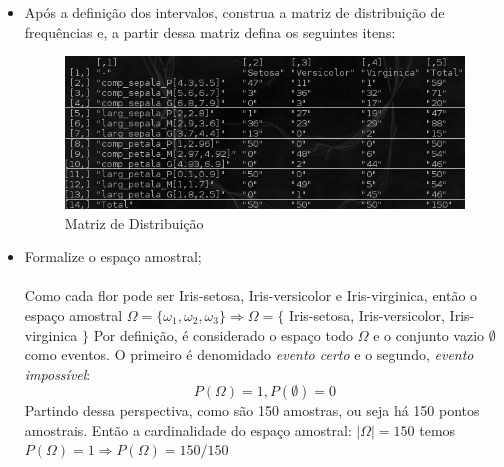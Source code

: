 \documentclass[a4paper, 12pt]{article}
\begin{document}
\begin{enumerate}
\begin{itemize}
\item Após a definição dos intervalos, construa a matriz de distribuição de frequências e, a partir dessa matriz defina os seguintes itens:\\
  \begin{figure}[ht!]
    \centering
    \includegraphics[width=150mm]{img1.png}
    \caption{Matriz de Distribuição}
  \end{figure}

\item Formalize o espaço amostral;\\\\
  Como cada flor pode ser Iris-setosa, Iris-versicolor e Iris-virginica, então o espaço amostral $\Omega = \{\omega_1, \omega_2, \omega_3\} \Rightarrow  \Omega = \{$ Iris-setosa, Iris-versicolor, Iris-virginica $\} $
  Por definição, é considerado o espaço todo $\Omega$ e o conjunto vazio $\emptyset$ como eventos. O primeiro é denomidado \emph{evento certo} e o segundo, \emph{evento impossível}:\\
  $$P(\Omega)=1, P(\emptyset)=0$$
  Partindo dessa perspectiva, como são 150 amostras, ou seja há 150 pontos amostrais. Então a cardinalidade do espaço amostral: $\left\vert{\Omega}\right\vert = 150$ temos $P(\Omega)=1 \Rightarrow P(\Omega)=150/150$


\end{itemize}
\end{enumerate}
\end{document}
